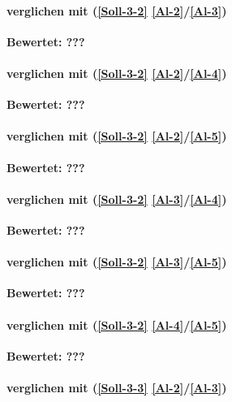 \paragraph*{  verglichen mit  (\ref{Soll-3-2} \ref{Al-2}/\ref{Al-3})}

\textbf{Bewertet: ???}

\paragraph*{  verglichen mit  (\ref{Soll-3-2} \ref{Al-2}/\ref{Al-4})}

\textbf{Bewertet: ???}

\paragraph*{  verglichen mit  (\ref{Soll-3-2} \ref{Al-2}/\ref{Al-5})}

\textbf{Bewertet: ???}

\paragraph*{  verglichen mit  (\ref{Soll-3-2} \ref{Al-3}/\ref{Al-4})}

\textbf{Bewertet: ???}

\paragraph*{  verglichen mit  (\ref{Soll-3-2} \ref{Al-3}/\ref{Al-5})}

\textbf{Bewertet: ???}


\paragraph*{  verglichen mit  (\ref{Soll-3-2} \ref{Al-4}/\ref{Al-5})}

\textbf{Bewertet: ???}


\paragraph*{  verglichen mit  (\ref{Soll-3-3} \ref{Al-2}/\ref{Al-3})}

